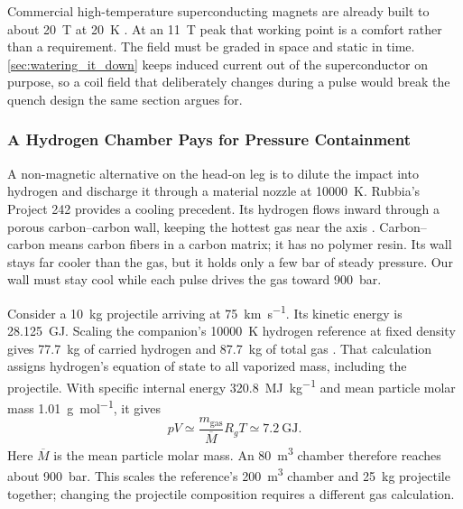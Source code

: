 \documentclass{article}
\begin{document}
Commercial high-temperature superconducting magnets are already built to about \SI{20}{\tesla} at \SI{20}{\kelvin} \cite{creely2020sparc}. At an \SI{11}{\tesla} peak that working point is a comfort rather than a requirement. The field must be graded in space and static in time. \autoref{sec:watering_it_down} keeps induced current out of the superconductor on purpose, so a coil field that deliberately changes during a pulse would break the quench design the same section argues for.

\subsubsection{A Hydrogen Chamber Pays for Pressure Containment}\label{sec:hydrogen_pressure_shell}

A non-magnetic alternative on the head-on leg is to dilute the impact into hydrogen and discharge it through a material nozzle at \SI{10000}{\kelvin}. Rubbia's Project 242 provides a cooling precedent. Its hydrogen flows inward through a porous carbon--carbon wall, keeping the hottest gas near the axis \cite{augelli2013project242}. Carbon--carbon means carbon fibers in a carbon matrix; it has no polymer resin. Its wall stays far cooler than the gas, but it holds only a few bar of steady pressure. Our wall must stay cool while each pulse drives the gas toward \SI{900}{\bar}.

Consider a \SI{10}{\kilogram} projectile arriving at \SI{75}{\kilo\meter\per\second}. Its kinetic energy is \SI{28.125}{\giga\joule}. Scaling the companion's \SI{10000}{\kelvin} hydrogen reference at fixed density gives \SI{77.7}{\kilogram} of carried hydrogen and \SI{87.7}{\kilogram} of total gas \cite{Katz_puffsat_impact_sim_2026}. That calculation assigns hydrogen's equation of state to all vaporized mass, including the projectile. With specific internal energy \SI{320.8}{\mega\joule\per\kilogram} and mean particle molar mass \SI{1.01}{\gram\per\mole}, it gives
\begin{equation}
    pV \simeq \frac{m_{\mathrm{gas}}}{\overline{M}}R_gT
       \simeq \SI{7.2}{\giga\joule}.
\end{equation}
Here $\overline{M}$ is the mean particle molar mass. An \SI{80}{\cubic\meter} chamber therefore reaches about \SI{900}{\bar}. This scales the reference's \SI{200}{\cubic\meter} chamber and \SI{25}{\kilogram} projectile together; changing the projectile composition requires a different gas calculation.
\end{document}
